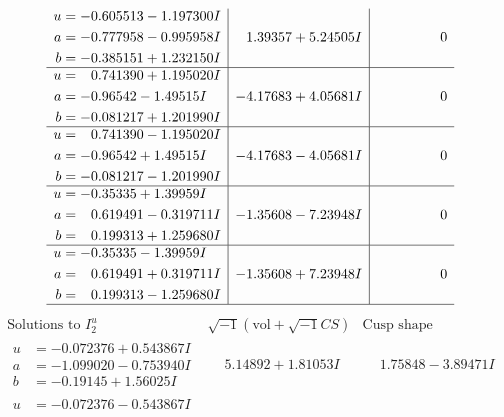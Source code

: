 \documentclass[1p]{elsarticle_modified}
\theoremstyle{definition}
\newcommand{\I}{\sqrt{-1}}
\begin{document}
$$\begin{array}{c|c|c}
\begin{aligned}
u &= -0.605513 - 1.197300 I \\
a &= -0.777958 - 0.995958 I \\
b &= -0.385151 + 1.232150 I\end{aligned}
 & \phantom{-}1.39357 + 5.24505 I & \phantom{-0.000000 } 0 \\ \hline\begin{aligned}
u &= \phantom{-}0.741390 + 1.195020 I \\
a &= -0.96542 - 1.49515 I \\
b &= -0.081217 + 1.201990 I\end{aligned}
 & -4.17683 + 4.05681 I & \phantom{-0.000000 } 0 \\ \hline\begin{aligned}
u &= \phantom{-}0.741390 - 1.195020 I \\
a &= -0.96542 + 1.49515 I \\
b &= -0.081217 - 1.201990 I\end{aligned}
 & -4.17683 - 4.05681 I & \phantom{-0.000000 } 0 \\ \hline\begin{aligned}
u &= -0.35335 + 1.39959 I \\
a &= \phantom{-}0.619491 - 0.319711 I \\
b &= \phantom{-}0.199313 + 1.259680 I\end{aligned}
 & -1.35608 - 7.23948 I & \phantom{-0.000000 } 0 \\ \hline\begin{aligned}
u &= -0.35335 - 1.39959 I \\
a &= \phantom{-}0.619491 + 0.319711 I \\
b &= \phantom{-}0.199313 - 1.259680 I\end{aligned}
 & -1.35608 + 7.23948 I & \phantom{-0.000000 } 0\\
 \hline 
 \end{array}$$\newpage$$\begin{array}{c|c|c}  
\text{Solutions to }I^u_{2}& \I (\text{vol} + \sqrt{-1}CS) & \text{Cusp shape}\\
 \hline 
\begin{aligned}
u &= -0.072376 + 0.543867 I \\
a &= -1.099020 - 0.753940 I \\
b &= -0.19145 + 1.56025 I\end{aligned}
 & \phantom{-}5.14892 + 1.81053 I & \phantom{-}1.75848 - 3.89471 I \\ \hline\begin{aligned}
u &= -0.072376 - 0.543867 I \\

\end{aligned}
\end{array}$$
\end{document}
